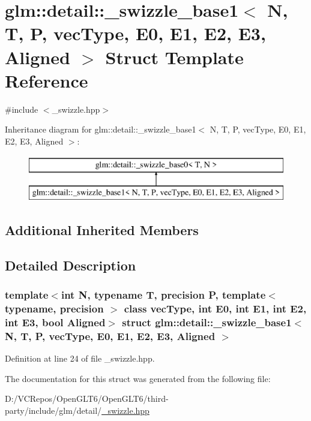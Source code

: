 \hypertarget{structglm_1_1detail_1_1__swizzle__base1}{}\section{glm\+::detail\+::\+\_\+swizzle\+\_\+base1$<$ N, T, P, vec\+Type, E0, E1, E2, E3, Aligned $>$ Struct Template Reference}
\label{structglm_1_1detail_1_1__swizzle__base1}


{\ttfamily \#include $<$\+\_\+swizzle.\+hpp$>$}

Inheritance diagram for glm\+::detail\+::\+\_\+swizzle\+\_\+base1$<$ N, T, P, vec\+Type, E0, E1, E2, E3, Aligned $>$\+:\begin{figure}[H]
\begin{center}
\leavevmode
\includegraphics[height=2.000000cm]{structglm_1_1detail_1_1__swizzle__base1}
\end{center}
\end{figure}
\subsection*{Additional Inherited Members}


\subsection{Detailed Description}
\subsubsection*{template$<$int N, typename T, precision P, template$<$ typename, precision $>$ class vec\+Type, int E0, int E1, int E2, int E3, bool Aligned$>$\newline
struct glm\+::detail\+::\+\_\+swizzle\+\_\+base1$<$ N, T, P, vec\+Type, E0, E1, E2, E3, Aligned $>$}



Definition at line 24 of file \+\_\+swizzle.\+hpp.



The documentation for this struct was generated from the following file\+:\begin{DoxyCompactItemize}
\item 
D\+:/\+V\+C\+Repos/\+Open\+G\+L\+T6/\+Open\+G\+L\+T6/third-\/party/include/glm/detail/\mbox{\hyperlink{__swizzle_8hpp}{\+\_\+swizzle.\+hpp}}\end{DoxyCompactItemize}
